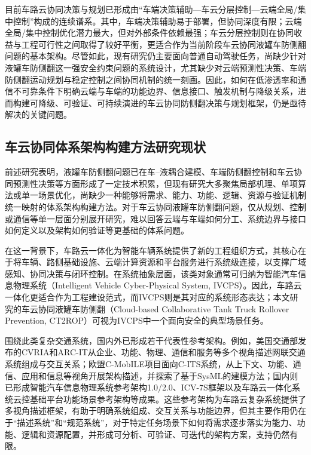       目前车路云协同决策与规划已形成由“车端决策辅助—车云分层控制—云端全局/集中控制”构成的连续谱系。其中，车端决策辅助易于部署，但协同深度有限；云端全局/集中控制优化潜力最大，但对外部条件依赖最强；车云分层控制则在协同收益与工程可行性之间取得了较好平衡，更适合作为当前阶段车云协同液罐车防侧翻问题的基本架构。尽管如此，现有研究仍主要面向普通自动驾驶任务，尚缺少针对液罐车防侧翻这一强安全约束问题的系统设计，尤其缺少对云端预测性决策、车端防侧翻运动规划与稳定控制之间协同机制的统一刻画。因此，如何在低渗透率和通信不可靠条件下明确云端与车端的功能边界、信息接口、触发机制与降级关系，进而构建可降级、可验证、可持续演进的车云协同防侧翻决策与规划框架，仍是亟待解决的关键问题。
  \subsection{车云协同体系架构构建方法研究现状}

    前述研究表明，液罐车防侧翻问题已在车--液耦合建模、车端防侧翻控制和车云协同预测性决策等方面形成了一定技术积累，但现有研究大多聚焦局部机理、单项算法或单一场景优化，尚缺少一种能够将需求、能力、功能、逻辑、资源与验证机制统一映射的体系架构构建方法。对于车云协同液罐车防侧翻问题，仅从规划、控制或通信等单一层面分别展开研究，难以回答云端与车端如何分工、系统边界与接口如何定义以及架构如何验证等更基础的体系问题。

    在这一背景下，车路云一体化为智能车辆系统提供了新的工程组织方式，其核心在于将车辆、路侧基础设施、云端计算资源和平台服务进行系统级连接，以支撑广域感知、协同决策与闭环控制\cite{likeqiang2020cloudcontrol,likeqiang2020principles,icv2023whiteroadcloud,ran2023vrc,guo2023greeniov}。在系统抽象层面，该类对象通常可归纳为智能汽车信息物理系统（Intelligent Vehicle Cyber-Physical System, IVCPS）。因此，车路云一体化更适合作为工程建设范式，而IVCPS则是其对应的系统形态表达；本文研究的车云协同液罐车防侧翻（Cloud-based Collaborative Tank Truck Rollover Prevention, CT2ROP）可视为IVCPS中一个面向安全的典型场景任务。

    围绕此类复杂交通系统，国内外已形成若干代表性参考架构。例如，美国交通部发布的CVRIA和ARC-IT从企业、功能、物理、通信和服务等多个视角描述网联交通系统组成与交互关系\cite{hejazi2022iottov2x,usdot2024arcit93}；欧盟C-MobILE项目面向C-ITS系统，从上下文、功能、通信、应用和信息等视角开展架构描述，并探索了基于SysML的建模方法\cite{cmobile2024project,lu2018citsdeployment,ferrandez2018cmobilecase}；国内则已形成智能汽车信息物理系统参考架构1.0/2.0、ICV-7S框架以及车路云一体化系统云控基础平台功能场景参考架构等成果\cite{caicv2019cpsarch10,caicv2021cpsarch20,xu2023mbseivcps,sae2024cloudplatformarch10}。这些参考架构为车路云复杂系统提供了多视角描述框架，有助于明确系统组成、交互关系与功能边界，但其主要作用仍在于“描述系统”和“规范系统”，对于特定任务场景下如何将需求逐步落实为能力、功能、逻辑和资源配置，并形成可分析、可验证、可迭代的架构方案，支持仍然有限。

